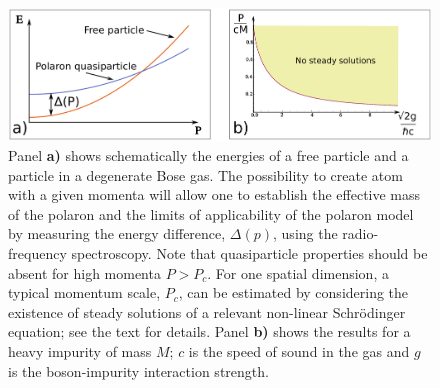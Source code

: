 \documentclass[twocolumn,amsmath,amssymb,showpacs,prl,superscriptaddress,aps]{revtex4-1}
\begin{document}
\begin{figure}
\centerline{\includegraphics[scale=0.3]{figure3.pdf}}
\caption{Panel {\bf a)} shows schematically the energies of a free particle and
a particle in a degenerate Bose gas. The possibility to create atom with a given momenta 
will allow one to establish the effective mass of the polaron
and the limits of applicability of the polaron model by measuring the energy difference, $\Delta(p)$, using the radio-frequency spectroscopy.
Note that quasiparticle properties should be absent for high momenta $P>P_c$. For one spatial dimension, a typical momentum scale, $P_c$, 
can be estimated  by considering the existence of steady solutions 
of a relevant non-linear Schr{\"o}dinger equation; see the text for details. Panel {\bf b)} 
shows the results for a heavy impurity of mass $M$; $c$ is the speed of sound in the gas
and $g$ is the boson-impurity interaction strength.
  }
\label{fig:Figure3}
\end{figure}
\end{document}
